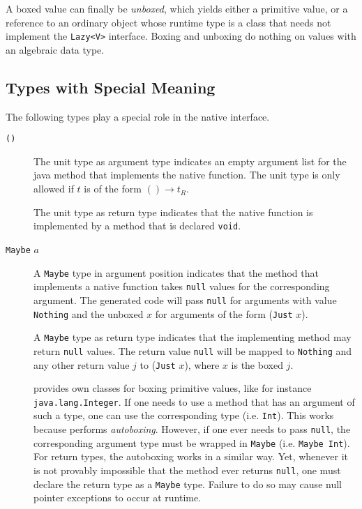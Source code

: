 A boxed value can finally be \emph{unboxed}, which yields either a primitive value, or a reference to an ordinary \java{} object whose runtime type is a \java{} class that needs not implement the \texttt{Lazy<V>} interface. Boxing and unboxing do nothing on values with an algebraic data type.

\subsection*{Types with Special Meaning}

The following types play a special role in the native interface.

\begin{description}
\item[\texttt{()}] The unit type as argument type indicates an empty argument list for the java method that implements the native function. The unit type is only allowed if $t$ is of the form $() \rightarrow t_R$.

The unit type as return type indicates that the native function is implemented by a \java{} method that is declared \texttt{void}.

\item[\texttt{Maybe} $a$] A \texttt{Maybe} type in argument position indicates that the \java{} method that implements a native function takes \texttt{null} values for the corresponding argument. The generated code will pass \texttt{null} for arguments with value \texttt{Nothing} and the unboxed $x$ for arguments of the form (\texttt{Just} $x$).

A \texttt{Maybe} type as return type indicates that the implementing method may return \texttt{null} values. The return value \texttt{null} will be mapped to \texttt{Nothing} and any other return value $j$ to (\texttt{Just} $x$), where $x$ is the boxed $j$.

\java{} provides own classes for boxing primitive values, like for instance \texttt{java.lang.Integer}. If one needs to use a method that has an argument of such a type, one can use the corresponding \frege{} type (i.e. \texttt{Int}). This works because \java{} performs \emph{autoboxing}. However, if one ever needs to pass \texttt{null}, the corresponding argument type must be wrapped in \texttt{Maybe} (i.e. \texttt{Maybe Int}). For return types, the autoboxing works in a similar way. Yet, whenever it is not provably impossible that the method ever returns \texttt{null}, one must declare the return type as a \texttt{Maybe} type. Failure to do so may cause null pointer exceptions to occur at runtime.


\end{description}
